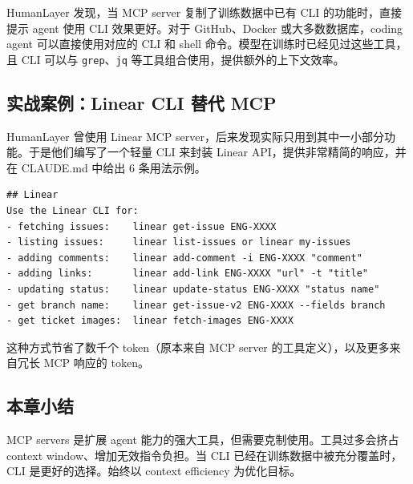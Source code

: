 HumanLayer 发现，当 MCP server 复制了训练数据中已有 CLI 的功能时，直接提示 agent 使用 CLI 效果更好。对于 GitHub、Docker 或大多数数据库，coding agent 可以直接使用对应的 CLI 和 shell 命令。模型在训练时已经见过这些工具，且 CLI 可以与 \texttt{grep}、\texttt{jq} 等工具组合使用，提供额外的上下文效率。

\subsection{实战案例：Linear CLI 替代 MCP}

HumanLayer 曾使用 Linear MCP server，后来发现实际只用到其中一小部分功能。于是他们编写了一个轻量 CLI 来封装 Linear API，提供非常精简的响应，并在 CLAUDE.md 中给出 6 条用法示例。

\begin{lstlisting}[caption={CLAUDE.md 中的 Linear CLI 示例配置},language={}]
## Linear
Use the Linear CLI for:
- fetching issues:    linear get-issue ENG-XXXX
- listing issues:     linear list-issues or linear my-issues
- adding comments:    linear add-comment -i ENG-XXXX "comment"
- adding links:       linear add-link ENG-XXXX "url" -t "title"
- updating status:    linear update-status ENG-XXXX "status name"
- get branch name:    linear get-issue-v2 ENG-XXXX --fields branch
- get ticket images:  linear fetch-images ENG-XXXX
\end{lstlisting}

这种方式节省了数千个 token（原本来自 MCP server 的工具定义），以及更多来自冗长 MCP 响应的 token。

\subsection{本章小结}

MCP servers 是扩展 agent 能力的强大工具，但需要克制使用。工具过多会挤占 context window、增加无效指令负担。当 CLI 已经在训练数据中被充分覆盖时，CLI 是更好的选择。始终以 context efficiency 为优化目标。


